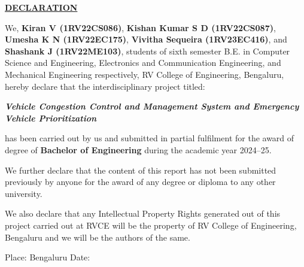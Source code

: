 \begin{titlepage}
    
    \thispagestyle{empty}
    \vspace{-0.75cm}
    
    \begin{center}
      \Large\textbf{\underline{DECLARATION}} \par
    \end{center}
    
    \vspace{1cm}
    \noindent We, \textbf{Kiran V (1RV22CS086)}, \textbf{Kishan Kumar S D (1RV22CS087)}, \textbf{Umesha K N (1RV22EC175)}, \textbf{Vivitha Sequeira (1RV23EC416)}, and \textbf{Shashank J (1RV22ME103)}, students of sixth semester B.E. in Computer Science and Engineering, Electronics and Communication Engineering, and Mechanical Engineering respectively, RV College of Engineering, Bengaluru, hereby declare that the interdisciplinary project titled:
    
    \begin{center}
      \textbf{\textit{Vehicle Congestion Control and Management System and Emergency Vehicle Prioritization}}
    \end{center}
    
    has been carried out by us and submitted in partial fulfilment for the award of degree of \textbf{Bachelor of Engineering} during the academic year 2024–25.
    
    \vspace{0.5cm}
    \noindent We further declare that the content of this report has not been submitted previously by anyone for the award of any degree or diploma to any other university.
    
    \vspace{0.5cm}
    \noindent We also declare that any Intellectual Property Rights generated out of this project carried out at RVCE will be the property of RV College of Engineering, Bengaluru and we will be the authors of the same.
    
    \vspace{1cm}
    \noindent Place: Bengaluru \hfill Date: \hrulefill
    

\end{titlepage}
